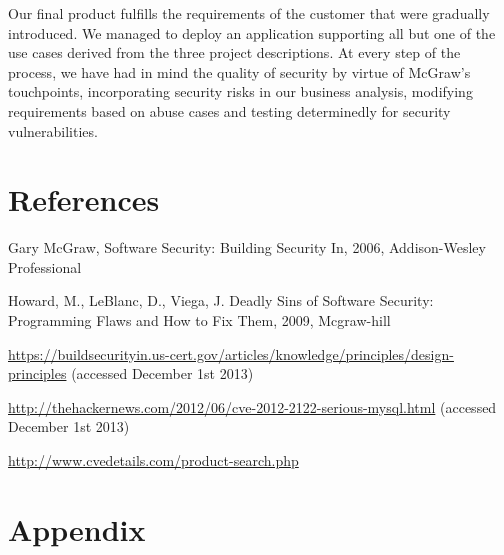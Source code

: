 \documentclass[a4paper]{article}
\begin{document}
Our final product fulfills the requirements of the customer that were gradually introduced. 
We managed to deploy an application supporting all but one of the use cases derived from the three project descriptions. 
At every step of the process, we have had in mind the quality of security by virtue of McGraw's touchpoints\cite{McGraw2006}, incorporating security risks in our business analysis, modifying requirements based on abuse cases and testing determinedly for security vulnerabilities.


\newpage
\section{References}
\begin{thebibliography}{9}
Gary McGraw,
Software Security: Building Security In,
2006,
Addison-Wesley Professional 

Howard, M., LeBlanc, D., Viega, J.
Deadly Sins of Software Security: Programming Flaws and How to Fix Them,
2009,
Mcgraw-hill

\href{https://buildsecurityin.us-cert.gov/articles/knowledge/principles/design-principles}{https://buildsecurityin.us-cert.gov/articles/knowledge/principles/design-principles} (accessed December 1st 2013)

\href{http://thehackernews.com/2012/06/cve-2012-2122-serious-mysql.html}{http://thehackernews.com/2012/06/cve-2012-2122-serious-mysql.html} 
 (accessed December 1st 2013)
 
\href{http://www.cvedetails.com/product-search.php}{http://www.cvedetails.com/product-search.php}
\end{thebibliography}

\newpage
\section{Appendix}
\end{document}

